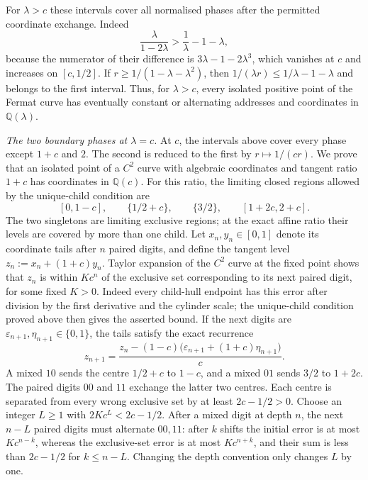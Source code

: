 For $\lambda>c$ these intervals cover all normalised phases after the permitted coordinate exchange. Indeed
\[
\frac{\lambda}{1-2\lambda}>\frac1\lambda-1-\lambda,
\]
because the numerator of their difference is $3\lambda-1-2\lambda^3$, which vanishes at $c$ and increases on $[c,1/2]$. If $r\ge1/(1-\lambda-\lambda^2)$, then $1/(\lambda r)\le1/\lambda-1-\lambda$ and belongs to the first interval. Thus, for $\lambda>c$, every isolated positive point of the Fermat curve has eventually constant or alternating addresses and coordinates in $\mathbb Q(\lambda)$.

\par\medskip\noindent\emph{The two boundary phases at $\lambda=c$.}
At $c$, the intervals above cover every phase except $1+c$ and $2$. The second is reduced to the first by $r\mapsto1/(cr)$. We prove that an isolated point of a $C^2$ curve with algebraic coordinates and tangent ratio $1+c$ has coordinates in $\mathbb Q(c)$.
For this ratio, the limiting closed regions allowed by the unique-child condition are
\[
[0,1-c],\qquad \{1/2+c\},\qquad
\{3/2\},\qquad [1+2c,2+c].
\]
The two singletons are limiting exclusive regions; at the exact affine ratio their levels are covered by more than one child.
Let $x_n,y_n\in[0,1]$ denote its coordinate tails after $n$ paired digits, and define the tangent level
$z_n:=x_n+(1+c)y_n$.
Taylor expansion of the $C^2$ curve at the fixed point shows that $z_n$ is within $Kc^n$ of the exclusive set corresponding to its next paired digit, for some fixed $K>0$. Indeed every child-hull endpoint has this error after division by the first derivative and the cylinder scale; the unique-child condition proved above then gives the asserted bound.
If the next digits are $\varepsilon_{n+1},\eta_{n+1}\in\{0,1\}$, the tails satisfy the exact recurrence
\[
z_{n+1}
=\frac{z_n-(1-c)\bigl(\varepsilon_{n+1}+(1+c)\eta_{n+1}\bigr)}{c}.
\]
A mixed $10$ sends the centre $1/2+c$ to $1-c$, and a mixed $01$ sends $3/2$ to $1+2c$. The paired digits $00$ and $11$ exchange the latter two centres. Each centre is separated from every wrong exclusive set by at least $2c-1/2>0$.
Choose an integer $L\ge1$ with $2Kc^L<2c-1/2$. After a mixed digit at depth $n$, the next $n-L$ paired digits must alternate $00,11$: after $k$ shifts the initial error is at most $Kc^{n-k}$, whereas the exclusive-set error is at most $Kc^{n+k}$, and their sum is less than $2c-1/2$ for $k\le n-L$. Changing the depth convention only changes $L$ by one.

